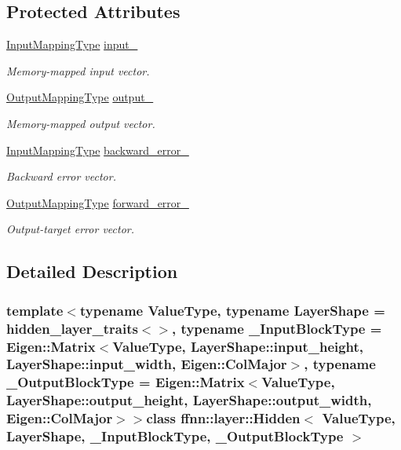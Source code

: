 \subsection*{Protected Attributes}
\begin{DoxyCompactItemize}
\item 
\hyperlink{classffnn_1_1layer_1_1_hidden_a9297d5b8ac45dc288ee1b91f15bb4047}{Input\-Mapping\-Type} \hyperlink{classffnn_1_1layer_1_1_hidden_a1177e86b75ad7ba87aa4e855defa5851}{input\-\_\-}
\begin{DoxyCompactList}\small\item\em Memory-\/mapped input vector. \end{DoxyCompactList}\item 
\hyperlink{classffnn_1_1layer_1_1_hidden_a619ae9b0890cb86b66ac2b591b5a5610}{Output\-Mapping\-Type} \hyperlink{classffnn_1_1layer_1_1_hidden_adf9818c784dccc1860fe8384264cc4be}{output\-\_\-}
\begin{DoxyCompactList}\small\item\em Memory-\/mapped output vector. \end{DoxyCompactList}\item 
\hyperlink{classffnn_1_1layer_1_1_hidden_a9297d5b8ac45dc288ee1b91f15bb4047}{Input\-Mapping\-Type} \hyperlink{classffnn_1_1layer_1_1_hidden_a94312439d5029c9c779ff778f18f95a8}{backward\-\_\-error\-\_\-}
\begin{DoxyCompactList}\small\item\em Backward error vector. \end{DoxyCompactList}\item 
\hyperlink{classffnn_1_1layer_1_1_hidden_a619ae9b0890cb86b66ac2b591b5a5610}{Output\-Mapping\-Type} \hyperlink{classffnn_1_1layer_1_1_hidden_af1f439bdd3645a5ee444455d822b5143}{forward\-\_\-error\-\_\-}
\begin{DoxyCompactList}\small\item\em Output-\/target error vector. \end{DoxyCompactList}\end{DoxyCompactItemize}


\subsection{Detailed Description}
\subsubsection*{template$<$typename Value\-Type, typename Layer\-Shape = hidden\-\_\-layer\-\_\-traits$<$$>$, typename \-\_\-\-Input\-Block\-Type = Eigen\-::\-Matrix$<$\-Value\-Type, Layer\-Shape\-::input\-\_\-height,  Layer\-Shape\-::input\-\_\-width,  Eigen\-::\-Col\-Major$>$, typename \-\_\-\-Output\-Block\-Type = Eigen\-::\-Matrix$<$\-Value\-Type, Layer\-Shape\-::output\-\_\-height, Layer\-Shape\-::output\-\_\-width, Eigen\-::\-Col\-Major$>$$>$class ffnn\-::layer\-::\-Hidden$<$ Value\-Type, Layer\-Shape, \-\_\-\-Input\-Block\-Type, \-\_\-\-Output\-Block\-Type $>$}

